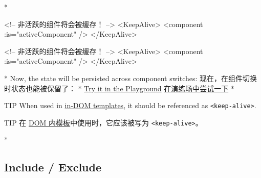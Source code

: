 \begin{paracol}{2}
\switchcolumn[0]*%
\begin{codeHtml}
<!-- 非活跃的组件将会被缓存！ -->
<KeepAlive>
  <component :is="activeComponent" />
</KeepAlive>
\end{codeHtml}
\switchcolumn
\begin{codeHtml}
<!-- 非活跃的组件将会被缓存！ -->
<KeepAlive>
  <component :is="activeComponent" />
</KeepAlive>
\end{codeHtml}
\switchcolumn[0]*%
Now, the state will be persisted across component switches:
\switchcolumn
现在，在组件切换时状态也能被保留了：
\switchcolumn[0]*%
\href{https://play.vuejs.org/\#eNqtUsFOwzAM/RWrl4IGC+cqq2h3RFw495K12YhIk6hJi1DVf8dJSllBaAJxi+2XZz8/j0lhzHboeZIl1NadMA4sd73JKyVaozsHI9hnJqV+feJHmODY6RZS/JEuiL1uTTEXtiREnnINKFeAcgZUqtbKOqj7ruPKwe6s2VVguq4UJXEynAkDx1sjmeMYAdBGDFBLZu2uShre6ioJeaxIduAyp0KZ3oF7MxwRHWsEQmC4bXXDJWbmxpjLBiZ7DwptMUFyKCiJNP/BWUbO8gvnA+emkGKIgkKqRrRWfh+Z8MIWwpySpfbxn6wJKMGV4IuSs0UlN1HVJae7bxYvBuk+2IOIq7sLnph8P9u5DJv5VfpWWLaGqTzwZTCOM/M0IaMvBMihd04ruK+lqF/8Ajxms8EFbCiJxR8khsP6ncQosLWnWV6a/kUf2nqu75Fby04chA0iPftaYryhz6NBRLjdtajpHZTWPio=}{Try
it in the Playground}
\switchcolumn
\href{https://play.vuejs.org/\#eNqtUsFOwzAM/RWrl4IGC+cqq2h3RFw495K12YhIk6hJi1DVf8dJSllBaAJxi+2XZz8/j0lhzHboeZIl1NadMA4sd73JKyVaozsHI9hnJqV+feJHmODY6RZS/JEuiL1uTTEXtiREnnINKFeAcgZUqtbKOqj7ruPKwe6s2VVguq4UJXEynAkDx1sjmeMYAdBGDFBLZu2uShre6ioJeaxIduAyp0KZ3oF7MxwRHWsEQmC4bXXDJWbmxpjLBiZ7DwptMUFyKCiJNP/BWUbO8gvnA+emkGKIgkKqRrRWfh+Z8MIWwpySpfbxn6wJKMGV4IuSs0UlN1HVJae7bxYvBuk+2IOIq7sLnph8P9u5DJv5VfpWWLaGqTzwZTCOM/M0IaMvBMihd04ruK+lqF/8Ajxms8EFbCiJxR8khsP6ncQosLWnWV6a/kUf2nqu75Fby04chA0iPftaYryhz6NBRLjdtajpHZTWPio=}{在演练场中尝试一下}
\switchcolumn[0]*%
\begin{vueQuote}{TIP}
When used in
\href{https://vuejs.org/guide/essentials/component-basics.html\#in-dom-template-parsing-caveats}{in-DOM
templates}, it should be referenced as
\texttt{\textless{}keep-alive\textgreater{}}.
\end{vueQuote} 
\switchcolumn
\begin{vueQuote}{TIP}
在
\href{https://cn.vuejs.org/guide/essentials/component-basics.html\#in-dom-template-parsing-caveats}{DOM
内模板}中使用时，它应该被写为
\texttt{\textless{}keep-alive\textgreater{}}。
\end{vueQuote} 
\switchcolumn[0]*%
\subsection{Include / Exclude}
\switchcolumn

\end{paracol}

